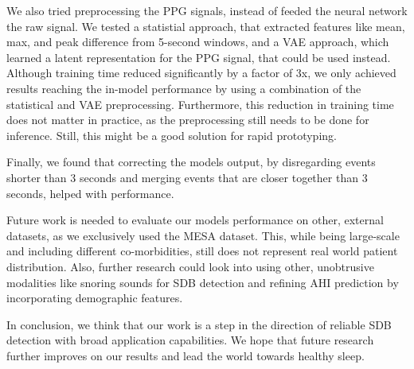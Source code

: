 We also tried preprocessing the PPG signals, instead of feeded the neural network the raw signal. We tested a statistial approach, that extracted features like mean, max, and peak difference from 5-second windows, and a VAE approach, which learned a latent representation for the PPG signal, that could be used instead. Although training time reduced significantly by a factor of 3x, we only achieved results reaching the in-model performance by using a combination of the statistical and VAE preprocessing. Furthermore, this reduction in training time does not matter in practice, as the preprocessing still needs to be done for inference. Still, this might be a good solution for rapid prototyping.

Finally, we found that correcting the models output, by disregarding events shorter than 3 seconds and merging events that are closer together than 3 seconds, helped with performance.

Future work is needed to evaluate our models performance on other, external datasets, as we exclusively used the MESA dataset. This, while being large-scale and including different co-morbidities, still does not represent real world patient distribution.
Also, further research could look into using other, unobtrusive modalities like snoring sounds for SDB detection and refining AHI prediction by incorporating demographic features.

In conclusion, we think that our work is a step in the direction of reliable SDB detection with broad application capabilities. We hope that future research further improves on our results and lead the world towards healthy sleep.